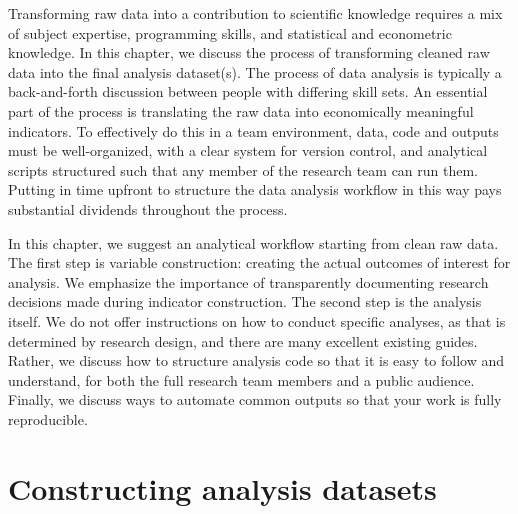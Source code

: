 
\begin{fullwidth}


Transforming raw data into a contribution to scientific knowledge
requires a mix of subject expertise, programming skills,
and statistical and econometric knowledge.
In this chapter, we discuss the process of transforming
cleaned raw data into the final analysis dataset(s).
The process of data analysis is typically
a back-and-forth discussion between people
with differing skill sets.
An essential part of the process is translating the
raw data into economically meaningful indicators.
To effectively do this in a team environment,
data, code and outputs must be well-organized,
with a clear system for version control,
and analytical scripts structured such that any member of the research team can run them.
Putting in time upfront to structure the data analysis workflow
in this way pays substantial dividends throughout the process.

In this chapter, we suggest an analytical workflow
starting from clean raw data.
The first step is variable construction:
creating the actual outcomes of interest for analysis.
We emphasize the importance of transparently documenting research decisions
made during indicator construction.
The second step is the analysis itself.
We do not offer instructions on how to conduct specific analyses,
as that is determined by research design,
and there are many excellent existing guides.
Rather, we discuss how to structure analysis code
so that it is easy to follow and understand,
for both the full research team members and a public audience.
Finally, we discuss ways to automate common outputs
so that your work is fully reproducible.

\end{fullwidth}


\section{Constructing analysis datasets}

